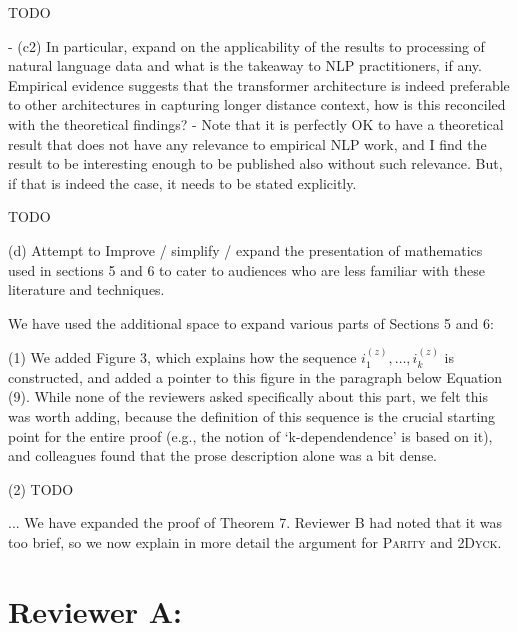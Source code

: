 \documentclass[11pt,a4paper]{article}
\newcommand\response[1]{{\color{blue}#1}}
\begin{document}
\response{TODO}

- (c2) In particular, expand on the applicability of the results to
processing of natural language data and what is the takeaway to NLP
practitioners, if any. Empirical evidence suggests that the transformer
architecture is indeed preferable to other architectures in capturing longer
distance context, how is this reconciled with the theoretical findings?
- Note that it is perfectly OK to have a theoretical result that does not
have any relevance to empirical NLP work, and I find the result to be
interesting enough to be published also without such relevance. But, if that
is indeed the case, it needs to be stated explicitly.

\response{TODO}

(d) Attempt to Improve / simplify / expand the presentation of mathematics
used in sections 5 and 6 to cater to audiences who are less familiar with
these literature and techniques.

\response{We have used the additional space to expand various parts of Sections 5 and 6:}

\response{(1) We added Figure 3, which explains how the sequence $i^{(z)}_1, \dots, i^{(z)}_k$ is constructed, and added a pointer to this figure in the paragraph below Equation (9). While none of the reviewers asked specifically about this part, we felt this was worth adding, because the definition of this sequence is the crucial starting point for the entire proof (e.g., the notion of `k-dependendence' is based on it), and colleagues found that the prose description alone was a bit dense.}

\response{(2) TODO}

\response{... We have expanded the proof of Theorem 7. Reviewer B had noted that it was too brief, so we now explain in more detail the argument for \textsc{Parity} and \textsc{2Dyck}.}


\section{Reviewer A:}
\end{document}
